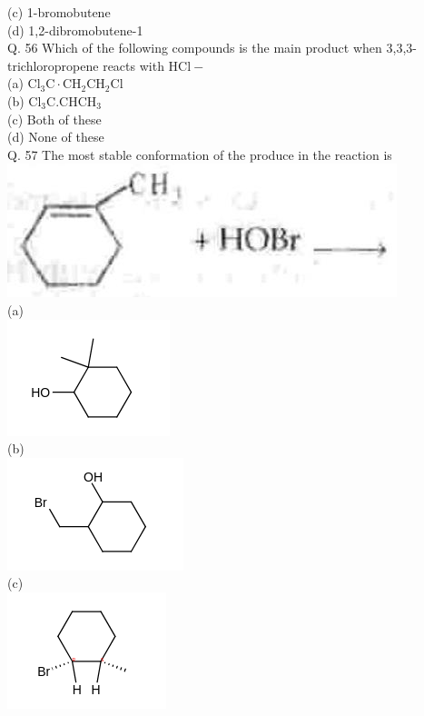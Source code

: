 \documentclass[10pt]{article}
\begin{document}
(c) 1-bromobutene\\
(d) 1,2-dibromobutene-1\\
Q. 56 Which of the following compounds is the main product when 3,3,3-trichloropropene reacts with $\mathrm{HCl}-$\\
(a) $\mathrm{Cl}_{3} \mathrm{C} \cdot \mathrm{CH}_{2} \mathrm{CH}_{2} \mathrm{Cl}$\\
(b) $\mathrm{Cl}_{3} \mathrm{C.CHCH}_{3}$\\
(c) Both of these\\
(d) None of these\\
Q. 57 The most stable conformation of the produce in the reaction is\\
\includegraphics[max width=\textwidth, center]{2025_01_28_8470952b98110cec3aabg-233}\\
(a)\\
\includegraphics{smile-32842f9e7f06f2f7cf28ed7f7a8d97f20550004a}\\
(b)\\
\includegraphics{smile-318ca5fcb650f7e71ffe4236fcb23801b243d49d}\\
(c)\\
\includegraphics{smile-a224669d527b1095907608168aaa692fab3266b7}\\
\end{document}
